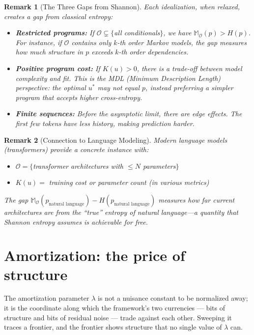 \documentclass[11pt]{article}
\newtheorem{remark}{Remark}
\begin{document}
\begin{remark}[The Three Gaps from Shannon]
Each idealization, when relaxed, creates a gap from classical entropy:
\begin{itemize}
    \item \textbf{Restricted programs:} If $\mathcal{O} \subsetneq \{$all conditionals$\}$, we have $\mathbb{M}_\mathcal{O}(p) > H(p)$. For instance, if $\mathcal{O}$ contains only $k$-th order Markov models, the gap measures how much structure in $p$ exceeds $k$-th order dependencies.

    \item \textbf{Positive program cost:} If $K(u) > 0$, there is a trade-off between model complexity and fit. This is the MDL (Minimum Description Length) perspective: the optimal $u^*$ may \emph{not} equal $p$, instead preferring a simpler program that accepts higher cross-entropy.

    \item \textbf{Finite sequences:} Before the asymptotic limit, there are edge effects. The first few tokens have less history, making prediction harder.
\end{itemize}
\end{remark}

\begin{remark}[Connection to Language Modeling]
Modern language models (transformers) provide a concrete instance with:
\begin{itemize}
    \item $\mathcal{O} = \{$transformer architectures with $\leq N$ parameters$\}$
    \item $K(u) = $ training cost or parameter count (in various metrics)
\end{itemize}
The gap $\mathbb{M}_\mathcal{O}(p_{\text{natural language}}) - H(p_{\text{natural language}})$ measures how far current architectures are from the ``true'' entropy of natural language---a quantity that Shannon entropy assumes is achievable for free.
\end{remark}



\section{Amortization: the price of structure}\label{sec:amortization}

The amortization parameter $\lambda$ is not a nuisance constant to be normalized away; it is the coordinate along which the framework's two currencies --- bits of structure and bits of residual noise --- trade against each other. Sweeping it traces a frontier, and the frontier shows structure that no single value of $\lambda$ can.
\end{document}
